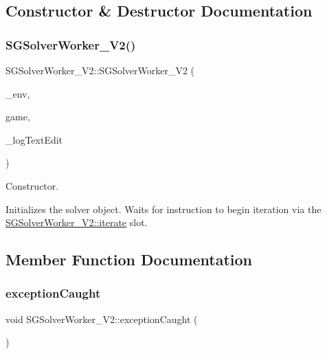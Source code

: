 \subsection{Constructor \& Destructor Documentation}
\mbox{\label{classSGSolverWorker__V2_a34d55eba6e02311b5b8d0d8371bf54c1}} 
\subsubsection{\texorpdfstring{S\+G\+Solver\+Worker\+\_\+\+V2()}{SGSolverWorker\_V2()}}
{\footnotesize\ttfamily S\+G\+Solver\+Worker\+\_\+\+V2\+::\+S\+G\+Solver\+Worker\+\_\+\+V2 (\begin{DoxyParamCaption}\item[{const \hyperlink{classSGEnv}{S\+G\+Env} \&}]{\+\_\+env,  }\item[{const \hyperlink{classSGGame}{S\+G\+Game} \&}]{game,  }\item[{Q\+Text\+Edit $\ast$}]{\+\_\+log\+Text\+Edit }\end{DoxyParamCaption})\hspace{0.3cm}{\ttfamily [inline]}}



Constructor. 

Initializes the solver object. Waits for instruction to begin iteration via the \hyperlink{classSGSolverWorker__V2_a3b7099cf8b559184743bca1eba3fa00e}{S\+G\+Solver\+Worker\+\_\+\+V2\+::iterate} slot. 

\subsection{Member Function Documentation}
\mbox{\label{classSGSolverWorker__V2_a2c783d5df57142df724a1a5841e19f42}} 
\subsubsection{\texorpdfstring{exception\+Caught}{exceptionCaught}}
{\footnotesize\ttfamily void S\+G\+Solver\+Worker\+\_\+\+V2\+::exception\+Caught (\begin{DoxyParamCaption}{ }\end{DoxyParamCaption})\hspace{0.3cm}{\ttfamily [signal]}}



